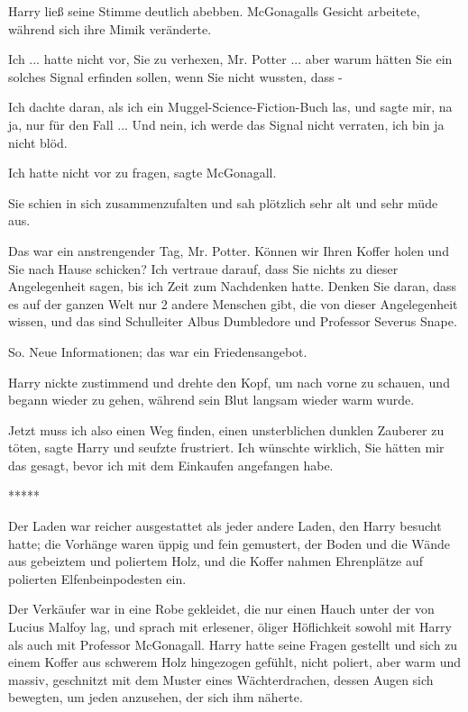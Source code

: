 Harry ließ seine Stimme deutlich abebben. McGonagalls Gesicht arbeitete, während
sich ihre Mimik veränderte.

\glqq{}Ich ... hatte nicht vor, Sie zu verhexen, Mr. Potter ... aber warum hätten
Sie ein solches Signal erfinden sollen, wenn Sie nicht wussten, dass -\grqq{}

\glqq{}Ich dachte daran, als ich ein Muggel-Science-Fiction-Buch las, und sagte
mir, na ja, nur für den Fall ... Und nein, ich werde das Signal nicht verraten,
ich bin ja nicht blöd.\grqq{}

\glqq{}Ich hatte nicht vor zu fragen\grqq{}, sagte McGonagall.

Sie schien in sich zusammenzufalten und sah plötzlich sehr alt und sehr müde
aus.

\glqq{}Das war ein anstrengender Tag, Mr. Potter. Können wir Ihren Koffer holen
und Sie nach Hause schicken? Ich vertraue darauf, dass Sie nichts zu dieser
Angelegenheit sagen, bis ich Zeit zum Nachdenken hatte. Denken Sie daran, dass
es auf der ganzen Welt nur 2 andere Menschen gibt, die von dieser Angelegenheit
wissen, und das sind Schulleiter Albus Dumbledore und Professor Severus
Snape.\grqq{}

So. Neue Informationen; das war ein Friedensangebot.

Harry nickte zustimmend und drehte den Kopf, um nach vorne zu schauen, und
begann wieder zu gehen, während sein Blut langsam wieder warm wurde.

\glqq{}Jetzt muss ich also einen Weg finden, einen unsterblichen dunklen
Zauberer zu töten\grqq{}, sagte Harry und seufzte frustriert. \glqq{}Ich
wünschte wirklich, Sie hätten mir das gesagt, bevor ich mit dem Einkaufen
angefangen habe.\grqq{}

\begin{center}*****\end{center}

Der Laden war reicher ausgestattet als jeder andere Laden, den Harry besucht
hatte; die Vorhänge waren üppig und fein gemustert, der Boden und die Wände aus
gebeiztem und poliertem Holz, und die Koffer nahmen Ehrenplätze auf polierten
Elfenbeinpodesten ein.

Der Verkäufer war in eine Robe gekleidet, die nur einen Hauch unter der von
Lucius Malfoy lag, und sprach mit erlesener, öliger Höflichkeit sowohl mit Harry
als auch mit Professor McGonagall. Harry hatte seine Fragen gestellt und sich zu
einem Koffer aus schwerem Holz hingezogen gefühlt, nicht poliert, aber warm und
massiv, geschnitzt mit dem Muster eines Wächterdrachen, dessen Augen sich
bewegten, um jeden anzusehen, der sich ihm näherte.

